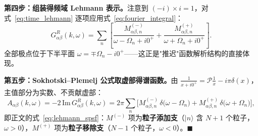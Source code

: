 \documentclass[onecolumn,aps,prl,superscriptaddress,longbibliography]{revtex4-2}
\begin{document}
\textbf{第四步：组装得频域 Lehmann 表示。}注意到 $(-i)\times i = 1$，对式~\eqref{eq:time_lehmann} 逐项应用式~\eqref{eq:fourier_integral}：
\begin{equation}\label{eq:freq_lehmann}
G^R_{\alpha\beta}(k,\omega) = \sum_n\left[\frac{M^{(-)}_{\alpha\beta,n}}{\omega - \Omega_n + i0^+} + \frac{M^{(+)}_{\alpha\beta,n}}{\omega + \Omega_n + i0^+}\right].
\end{equation}
全部极点位于下半平面 $\omega = \mp\Omega_n - i0^+$——这正是"推迟"函数解析结构的直接体现。

\textbf{第五步：Sokhotski--Plemelj 公式取虚部得谱函数。}由 $\frac{1}{x+i0^+} = \mathcal{P}\frac{1}{x} - i\pi\delta(x)$，主值部分为实数、不贡献虚部：
\begin{equation}
A_{\alpha\beta}(k,\omega) = -2\,\mathrm{Im}\,G^R_{\alpha\beta}(k,\omega) = 2\pi\sum_n\Big[M^{(-)}_{\alpha\beta,n}\,\delta\big(\omega-\Omega_n\big) + M^{(+)}_{\alpha\beta,n}\,\delta\big(\omega+\Omega_n\big)\Big],
\end{equation}
即正文的式~\eqref{eq:lehmann_spsf}：$M^{(-)}$ 项为\textbf{粒子添加支}（$|n\rangle$ 含 $N+1$ 个粒子，$\omega > 0$），$M^{(+)}$ 项为\textbf{粒子移除支}（$N-1$ 个粒子，$\omega < 0$）。$\blacksquare$
\end{document}
